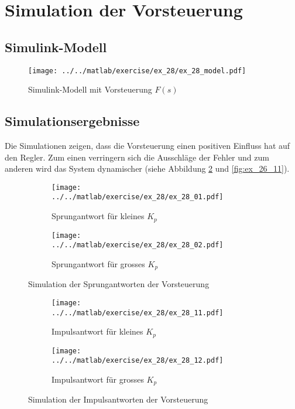 \section{Simulation der Vorsteuerung}

\subsection{Simulink-Modell}
\begin{figure}[h!]
	\centering
	\texttt{[image: ../../matlab/exercise/ex\_28/ex\_28\_model.pdf]}
	\caption{Simulink-Modell mit Vorsteuerung $F(s)$}
\end{figure}

\subsection{Simulationsergebnisse}
Die Simulationen zeigen, dass die Vorsteuerung einen positiven Einfluss hat
auf den Regler. Zum einen verringern sich die Ausschläge der Fehler und zum
anderen wird das System dynamischer (siehe Abbildung \ref{fig:ex_28_11} und
\ref{fig:ex_26_11}).
\begin{figure}[h!]
	\centering
	\begin{subfigure}{0.45\textwidth}
		\texttt{[image: ../../matlab/exercise/ex\_28/ex\_28\_01.pdf]}
		\caption{Sprungantwort für kleines $K_p$}
		\label{fig:ex_28_01}
	\end{subfigure}
	\hfill{}
	\begin{subfigure}{0.45\textwidth}
		\texttt{[image: ../../matlab/exercise/ex\_28/ex\_28\_02.pdf]}
		\caption{Sprungantwort für grosses $K_p$}
	\end{subfigure}
	\caption{Simulation der Sprungantworten der Vorsteuerung}
\end{figure}

\begin{figure}[h!]
	\begin{subfigure}{0.45\textwidth}
		\texttt{[image: ../../matlab/exercise/ex\_28/ex\_28\_11.pdf]}
		\caption{Impulsantwort für kleines $K_p$}
		\label{fig:ex_28_11}
	\end{subfigure}
	\hfill{}
	\begin{subfigure}{0.45\textwidth}
		\texttt{[image: ../../matlab/exercise/ex\_28/ex\_28\_12.pdf]}
		\caption{Impulsantwort für grosses $K_p$}
	\end{subfigure}
	\caption{Simulation der Impulsantworten der Vorsteuerung}
\end{figure}
